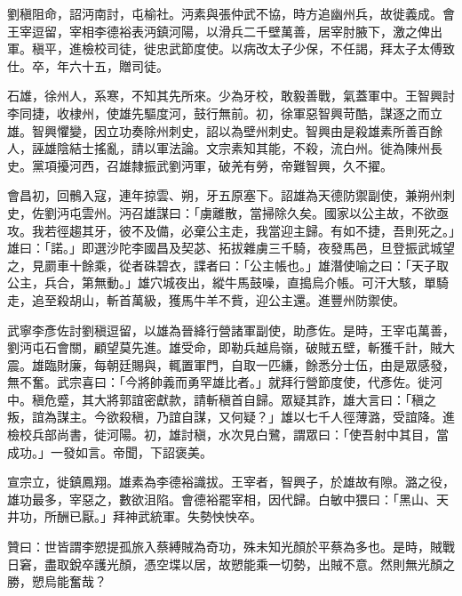 \begin{pinyinscope}
 劉稹阻命，詔沔南討，屯榆社。沔素與張仲武不協，時方追幽州兵，故徙義成。會王宰逗留，宰相李德裕表沔鎮河陽，以滑兵二千壁萬善，居宰肘腋下，激之俾出軍。稹平，進檢校司徒，徙忠武節度使。以病改太子少保，不任謁，拜太子太傅致仕。卒，年六十五，贈司徒。



 石雄，徐州人，系寒，不知其先所來。少為牙校，敢毅善戰，氣蓋軍中。王智興討李同捷，收棣州，使雄先驅度河，鼓行無前。初，徐軍惡智興苛酷，謀逐之而立雄。智興懼變，因立功奏除州刺史，詔以為壁州刺史。智興由是殺雄素所善百餘人，誣雄陰結士搖亂，請以軍法論。文宗素知其能，不殺，流白州。徙為陳州長史。黨項擾河西，召雄隸振武劉沔軍，破羌有勞，帝難智興，久不擢。



 會昌初，回鶻入寇，連年掠雲、朔，牙五原塞下。詔雄為天德防禦副使，兼朔州刺史，佐劉沔屯雲州。沔召雄謀曰：「虜離散，當掃除久矣。國家以公主故，不欲亟攻。我若徑趨其牙，彼不及備，必棄公主走，我當迎主歸。有如不捷，吾則死之。」雄曰：「諾。」即選沙陀李國昌及契苾、拓拔雜虜三千騎，夜發馬邑，旦登振武城望之，見罽車十餘乘，從者硃碧衣，諜者曰：「公主帳也。」雄潛使喻之曰：「天子取公主，兵合，第無動。」雄穴城夜出，縱牛馬鼓噪，直搗烏介帳。可汗大駭，單騎走，追至殺胡山，斬首萬級，獲馬牛羊不貲，迎公主還。進豐州防禦使。



 武寧李彥佐討劉稹逗留，以雄為晉絳行營諸軍副使，助彥佐。是時，王宰屯萬善，劉沔屯石會關，顧望莫先進。雄受命，即勒兵越烏嶺，破賊五壁，斬獲千計，賊大震。雄臨財廉，每朝廷賜與，輒置軍門，自取一匹縑，餘悉分士伍，由是眾感發，無不奮。武宗喜曰：「今將帥義而勇罕雄比者。」就拜行營節度使，代彥佐。徙河中。稹危蹙，其大將郭誼密獻款，請斬稹首自歸。眾疑其詐，雄大言曰：「稹之叛，誼為謀主。今欲殺稹，乃誼自謀，又何疑？」雄以七千人徑薄潞，受誼降。進檢校兵部尚書，徙河陽。初，雄討稹，水次見白鷺，謂眾曰：「使吾射中其目，當成功。」一發如言。帝聞，下詔褒美。



 宣宗立，徙鎮鳳翔。雄素為李德裕識拔。王宰者，智興子，於雄故有隙。潞之役，雄功最多，宰惡之，數欲沮陷。會德裕罷宰相，因代歸。白敏中猥曰：「黑山、天井功，所酬已厭。」拜神武統軍。失勢怏怏卒。



 贊曰：世皆謂李愬提孤旅入蔡縛賊為奇功，殊未知光顏於平蔡為多也。是時，賊戰日窘，盡取銳卒護光顏，憑空堞以居，故愬能乘一切勢，出賊不意。然則無光顏之勝，愬烏能奮哉？



\end{pinyinscope}